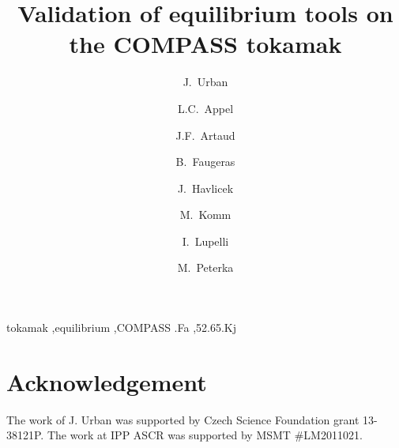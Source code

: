 \documentclass[preprint,5p,times]{elsarticle}
\begin{document}
\begin{frontmatter}



\title{Validation of equilibrium tools on the COMPASS tokamak}

 \author[label1]{J.~Urban}
 \author[label2]{L.C.~Appel}
 \author[label3]{J.F.~Artaud} 
 \author[label4]{B.~Faugeras} 
 \author[label1,label5]{J.~Havlicek}
 \author[label1]{M.~Komm}
 \author[label2]{I.~Lupelli} 
 \author[label1,label5]{M.~Peterka} 
 \address[label1]{Institute of Plasma Physics ASCR, Za Slovankou 3, 182 00 Praha 8, Czech Republic}
 \address[label2]{CCFE, Culham Science Centre, Abingdon, Oxfordshire, UK}
 \address[label3]{CEA, IRFM, F-13108 Saint Paul Lez Durance, France}
 \address[label4]{Laboratoire J.A. Dieudonné, UMR 7351, Université de Nice Sophia-Antipolis, Parc Valrose, 06108
Nice Cedex 02, France}
 \address[label5]{Department of Surface and Plasma Science, Faculty of Mathematics and Physics, Charles University in Prague, V Hole\v{s}ovi\v{c}k\'ach 2, 180~00 Praha 8, Czech Republic}


 
\begin{keyword}
tokamak \sep equilibrium \sep COMPASS 
.Fa \sep 52.65.Kj
\end{keyword}

\end{frontmatter}






\section*{Acknowledgement}
The work of J. Urban was supported by Czech Science Foundation grant 13-38121P.
The work at IPP ASCR was supported by MSMT \#LM2011021. 


{}
\end{document}
